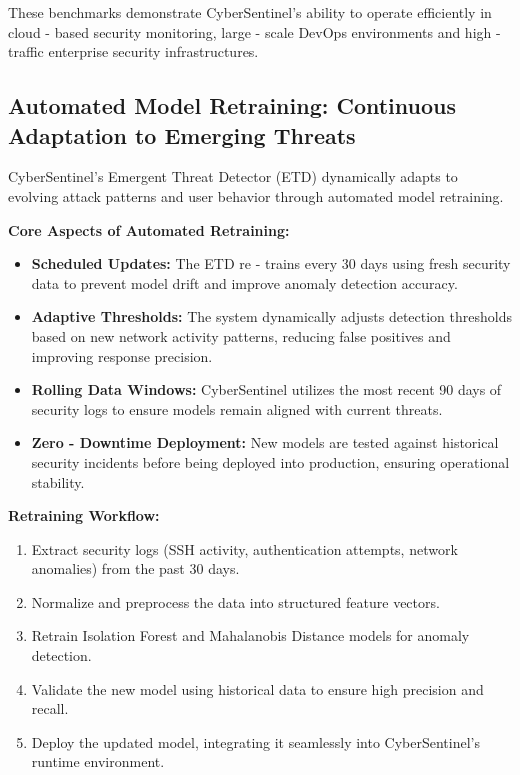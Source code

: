 \documentclass{article}
\begin{document}
These benchmarks demonstrate CyberSentinel’s ability to operate efficiently in cloud - based security monitoring, large - scale DevOps environments and high - traffic enterprise security infrastructures.

\subsection{Automated Model Retraining: Continuous Adaptation to Emerging Threats}

CyberSentinel’s Emergent Threat Detector (ETD) dynamically adapts to evolving attack patterns and user behavior through automated model retraining.

\textbf{Core Aspects of Automated Retraining:}
\begin{itemize}
    \item \textbf{Scheduled Updates:} The ETD re - trains every 30 days using fresh security data to prevent model drift and improve anomaly detection accuracy.
    \item \textbf{Adaptive Thresholds:} The system dynamically adjusts detection thresholds based on new network activity patterns, reducing false positives and improving response precision.
    \item \textbf{Rolling Data Windows:} CyberSentinel utilizes the most recent 90 days of security logs to ensure models remain aligned with current threats.
    \item \textbf{Zero - Downtime Deployment:} New models are tested against historical security incidents before being deployed into production, ensuring operational stability.
\end{itemize}

\textbf{Retraining Workflow:}
\begin{enumerate}
    \item Extract security logs (SSH activity, authentication attempts, network anomalies) from the past 30 days.
    \item Normalize and preprocess the data into structured feature vectors.
    \item Retrain Isolation Forest and Mahalanobis Distance models for anomaly detection.
    \item Validate the new model using historical data to ensure high precision and recall.
    \item Deploy the updated model, integrating it seamlessly into CyberSentinel’s runtime environment.
\end{enumerate}
\end{document}
